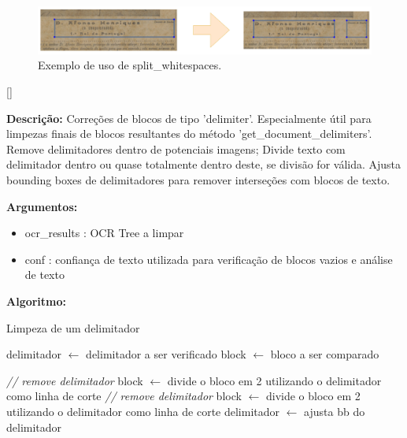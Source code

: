 \begin{figure}[H]
	\centering
	\includegraphics[width=1\textwidth]{images/ilustracoes/split_by_whitespaces_blocks.png}
	\caption{Exemplo de uso de split\_whitespaces.}
	\label{fig:split_by_whitespaces_blocks}
\end{figure}




[\normalsize]

\textbf{Descrição:} Correções de blocos de tipo 'delimiter'. Especialmente útil para limpezas finais de blocos resultantes do método 'get\_document\_delimiters'. Remove delimitadores dentro de potenciais imagens; Divide texto com delimitador dentro ou quase totalmente dentro deste, se divisão for válida. Ajusta bounding boxes de delimitadores para remover interseções com blocos de texto.

\textbf{Argumentos:}
\begin{itemize}\setlength\itemsep{-0.3em}
	\item ocr\_results : OCR Tree a limpar
	\item conf : confiança de texto utilizada para verificação de blocos vazios e análise de texto
\end{itemize}

\textbf{Algoritmo:}

\begin{breakablealgorithm}
	\caption{Limpeza de um delimitador}
	\footnotesize
	\begin{algorithmic}[1]
		\State delimitador $\leftarrow$ delimitador a ser verificado
		\State block $\leftarrow$ bloco a ser comparado
		
				\State \textit{// remove delimitador}
			\Else
					\State block $\leftarrow$ divide o bloco em 2 utilizando o delimitador como linha de corte
				\Else
					\State \textit{// remove delimitador}
				\EndIf
			\EndIf
				\State block $\leftarrow$ divide o bloco em 2 utilizando o delimitador como linha de corte
			\Else
				\State delimitador $\leftarrow$ ajusta bb do delimitador
			\EndIf
		\EndIf
	\end{algorithmic}
\end{breakablealgorithm}


